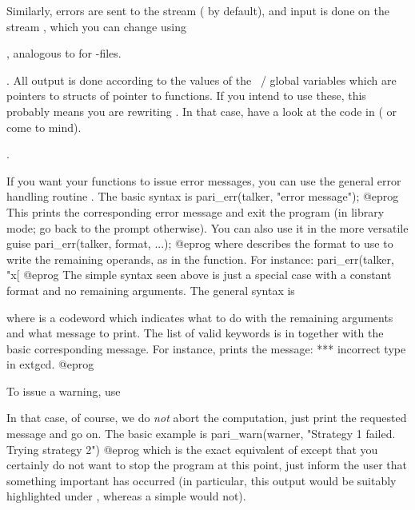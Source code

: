 Similarly, errors are sent to the stream  ( by
default), and input is done on the stream , which you can
change using

, analogous to  for
-files.

. All output is done according to the values of
the ~/  global variables which are pointers to
structs of pointer to functions. If you intend to use these, this
probably means you are rewriting . In that case, have a look at the
code in  ( or  come to mind).

.

\noindent
If you want your functions to issue error messages, you can use the general
error handling routine . The basic syntax is
%
\bprog
  pari_err(talker, "error message");
@eprog\noindent
This prints the corresponding error message and exit the program (in
library mode; go back to the  prompt otherwise).\label{se:err} You can
also use it in the more versatile guise
\bprog
  pari_err(talker, format, ...);
@eprog\noindent
where  describes the format to use to write the remaining
operands, as in the  function. For instance:
\bprog
  pari_err(talker, "x[%
@eprog\noindent
The simple syntax seen above is
just a special case with a constant format and no remaining arguments.
The general syntax is


\noindent where  is a codeword which indicates what to do with
the remaining arguments and what message to print. The list of valid keywords
is in  together with the basic corresponding
message. For instance,  prints the message:
\bprog
    ***   incorrect type in extgcd.
@eprog


\noindent To issue a warning, use

In that case, of course, we do \emph{not} abort the computation, just print
the requested message and go on. The basic example is
%
\bprog
    pari_warn(warner, "Strategy 1 failed. Trying strategy 2")
@eprog\noindent
which is the exact equivalent of  except that
you certainly do not want to stop the program at this point, just inform the
user that something important has occurred (in particular, this output would be
suitably highlighted under , whereas a simple  would not).

